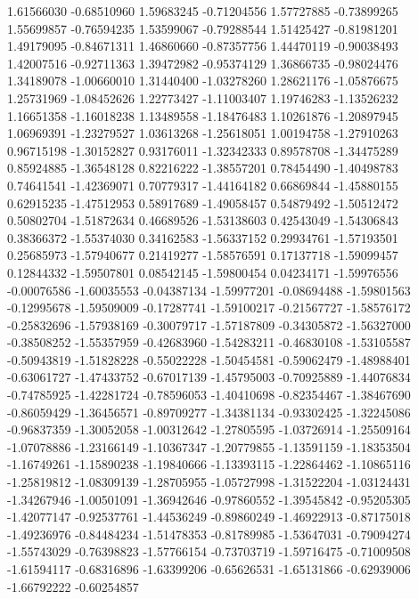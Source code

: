 1.61566030   -0.68510960 
1.59683245   -0.71204556 
1.57727885   -0.73899265 
1.55699857   -0.76594235 
1.53599067   -0.79288544 
1.51425427   -0.81981201 
1.49179095   -0.84671311 
1.46860660   -0.87357756 
1.44470119   -0.90038493 
1.42007516   -0.92711363 
1.39472982   -0.95374129 
1.36866735   -0.98024476 
1.34189078   -1.00660010 
1.31440400   -1.03278260 
1.28621176   -1.05876675 
1.25731969   -1.08452626 
1.22773427   -1.11003407 
1.19746283   -1.13526232 
1.16651358   -1.16018238 
1.13489558   -1.18476483 
1.10261876   -1.20897945 
1.06969391   -1.23279527 
1.03613268   -1.25618051 
1.00194758   -1.27910263 
0.96715198   -1.30152827 
0.93176011   -1.32342333 
0.89578708   -1.34475289 
0.85924885   -1.36548128 
0.82216222   -1.38557201 
0.78454490   -1.40498783 
0.74641541   -1.42369071 
0.70779317   -1.44164182 
0.66869844   -1.45880155 
0.62915235   -1.47512953 
0.58917689   -1.49058457 
0.54879492   -1.50512472 
0.50802704   -1.51872634 
0.46689526   -1.53138603 
0.42543049   -1.54306843 
0.38366372   -1.55374030 
0.34162583   -1.56337152 
0.29934761   -1.57193501 
0.25685973   -1.57940677 
0.21419277   -1.58576591 
0.17137718   -1.59099457 
0.12844332   -1.59507801 
0.08542145   -1.59800454 
0.04234171   -1.59976556 
-0.00076586  -1.60035553 
-0.04387134  -1.59977201 
-0.08694488  -1.59801563 
-0.12995678  -1.59509009 
-0.17287741  -1.59100217 
-0.21567727  -1.58576172 
-0.25832696  -1.57938169 
-0.30079717  -1.57187809 
-0.34305872  -1.56327000 
-0.38508252  -1.55357959 
-0.42683960  -1.54283211 
-0.46830108  -1.53105587 
-0.50943819  -1.51828228 
-0.55022228  -1.50454581 
-0.59062479  -1.48988401 
-0.63061727  -1.47433752 
-0.67017139  -1.45795003 
-0.70925889  -1.44076834 
-0.74785925  -1.42281724 
-0.78596053  -1.40410698 
-0.82354467  -1.38467690 
-0.86059429  -1.36456571 
-0.89709277  -1.34381134 
-0.93302425  -1.32245086 
-0.96837359  -1.30052058 
-1.00312642  -1.27805595 
-1.03726914  -1.25509164 
-1.07078886  -1.23166149 
-1.10367347  -1.20779855 
-1.13591159  -1.18353504 
-1.16749261  -1.15890238 
-1.19840666  -1.13393115 
-1.22864462  -1.10865116 
-1.25819812  -1.08309139 
-1.28705955  -1.05727998 
-1.31522204  -1.03124431 
-1.34267946  -1.00501091 
-1.36942646  -0.97860552 
-1.39545842  -0.95205305 
-1.42077147  -0.92537761 
-1.44536249  -0.89860249 
-1.46922913  -0.87175018 
-1.49236976  -0.84484234 
-1.51478353  -0.81789985 
-1.53647031  -0.79094274 
-1.55743029  -0.76398823 
-1.57766154  -0.73703719 
-1.59716475  -0.71009508 
-1.61594117  -0.68316896 
-1.63399206  -0.65626531 
-1.65131866  -0.62939006 
-1.66792222  -0.60254857 
